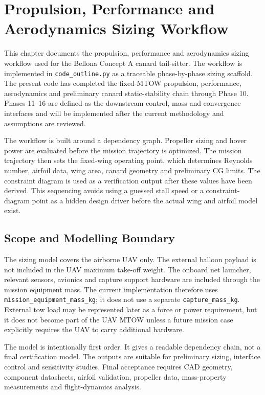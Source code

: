 \chapter{Propulsion, Performance and Aerodynamics Sizing Workflow}
\label{ch:ppa_methodology}

This chapter documents the propulsion, performance and aerodynamics sizing workflow used for the Bellona Concept A canard tail-sitter. The workflow is implemented in \texttt{code\_outline.py} as a traceable phase-by-phase sizing scaffold. The present code has completed the fixed-MTOW propulsion, performance, aerodynamics and preliminary canard static-stability chain through Phase 10. Phases 11--16 are defined as the downstream control, mass and convergence interfaces and will be implemented after the current methodology and assumptions are reviewed.

The workflow is built around a dependency graph. Propeller sizing and hover power are evaluated before the mission trajectory is optimized. The mission trajectory then sets the fixed-wing operating point, which determines Reynolds number, airfoil data, wing area, canard geometry and preliminary CG limits. The constraint diagram is used as a verification output after these values have been derived. This sequencing avoids using a guessed stall speed or a constraint-diagram point as a hidden design driver before the actual wing and airfoil model exist.

\section{Scope and Modelling Boundary}
\label{sec:ppa_scope_boundary}

The sizing model covers the airborne UAV only. The external balloon payload is not included in the UAV maximum take-off weight. The onboard net launcher, relevant sensors, avionics and capture support hardware are included through the mission equipment mass. The current implementation therefore uses \texttt{mission\_equipment\_mass\_kg}; it does not use a separate \texttt{capture\_mass\_kg}. External tow load may be represented later as a force or power requirement, but it does not become part of the UAV MTOW unless a future mission case explicitly requires the UAV to carry additional hardware.

The model is intentionally first order. It gives a readable dependency chain, not a final certification model. The outputs are suitable for preliminary sizing, interface control and sensitivity studies. Final acceptance requires CAD geometry, component datasheets, airfoil validation, propeller data, mass-property measurements and flight-dynamics analysis.

